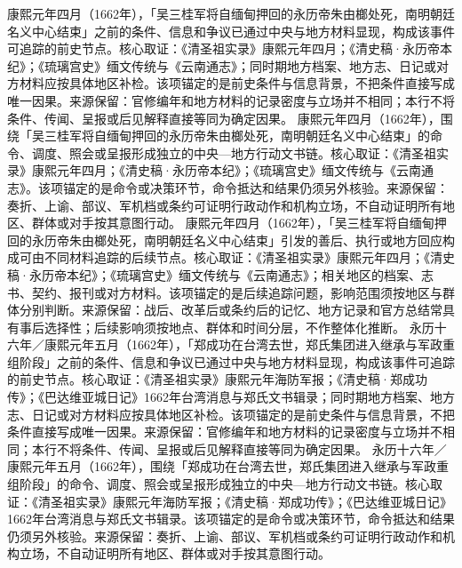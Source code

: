 康熙元年四月（1662年），「吴三桂军将自缅甸押回的永历帝朱由榔处死，南明朝廷名义中心结束」之前的条件、信息和争议已通过中央与地方材料显现，构成该事件可追踪的前史节点。核心取证：《清圣祖实录》康熙元年四月；《清史稿·永历帝本纪》；《琉璃宫史》缅文传统与《云南通志》；同时期地方档案、地方志、日记或对方材料应按具体地区补检。该项锚定的是前史条件与信息背景，不把条件直接写成唯一因果。来源保留：官修编年和地方材料的记录密度与立场并不相同；本行不将条件、传闻、呈报或后见解释直接等同为确定因果。
康熙元年四月（1662年），围绕「吴三桂军将自缅甸押回的永历帝朱由榔处死，南明朝廷名义中心结束」的命令、调度、照会或呈报形成独立的中央—地方行动文书链。核心取证：《清圣祖实录》康熙元年四月；《清史稿·永历帝本纪》；《琉璃宫史》缅文传统与《云南通志》。该项锚定的是命令或决策环节，命令抵达和结果仍须另外核验。来源保留：奏折、上谕、部议、军机档或条约可证明行政动作和机构立场，不自动证明所有地区、群体或对手按其意图行动。
康熙元年四月（1662年），「吴三桂军将自缅甸押回的永历帝朱由榔处死，南明朝廷名义中心结束」引发的善后、执行或地方回应构成可由不同材料追踪的后续节点。核心取证：《清圣祖实录》康熙元年四月；《清史稿·永历帝本纪》；《琉璃宫史》缅文传统与《云南通志》；相关地区的档案、志书、契约、报刊或对方材料。该项锚定的是后续追踪问题，影响范围须按地区与群体分别判断。来源保留：战后、改革后或条约后的记忆、地方记录和官方总结常具有事后选择性；后续影响须按地点、群体和时间分层，不作整体化推断。
永历十六年／康熙元年五月（1662年），「郑成功在台湾去世，郑氏集团进入继承与军政重组阶段」之前的条件、信息和争议已通过中央与地方材料显现，构成该事件可追踪的前史节点。核心取证：《清圣祖实录》康熙元年海防军报；《清史稿·郑成功传》；《巴达维亚城日记》1662年台湾消息与郑氏文书辑录；同时期地方档案、地方志、日记或对方材料应按具体地区补检。该项锚定的是前史条件与信息背景，不把条件直接写成唯一因果。来源保留：官修编年和地方材料的记录密度与立场并不相同；本行不将条件、传闻、呈报或后见解释直接等同为确定因果。
永历十六年／康熙元年五月（1662年），围绕「郑成功在台湾去世，郑氏集团进入继承与军政重组阶段」的命令、调度、照会或呈报形成独立的中央—地方行动文书链。核心取证：《清圣祖实录》康熙元年海防军报；《清史稿·郑成功传》；《巴达维亚城日记》1662年台湾消息与郑氏文书辑录。该项锚定的是命令或决策环节，命令抵达和结果仍须另外核验。来源保留：奏折、上谕、部议、军机档或条约可证明行政动作和机构立场，不自动证明所有地区、群体或对手按其意图行动。
